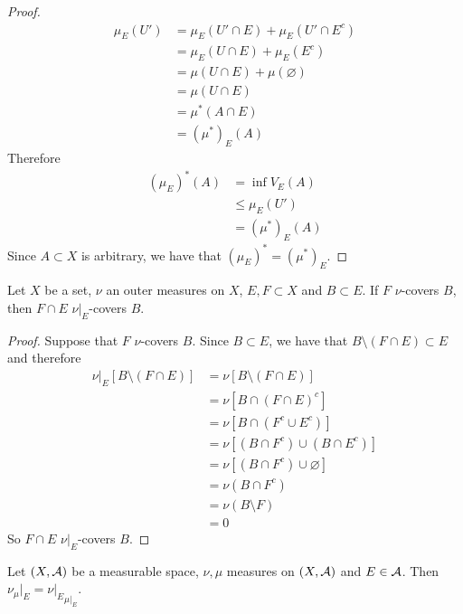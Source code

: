 \documentclass{book}
\begin{document}
\begin{proof}
\begin{align*}
			\mu_E(U')
			& = \mu_E(U' \cap E) + \mu_E(U' \cap E^c) \\
			& = \mu_E(U \cap E) + \mu_E(E^c) \\
			& = \mu(U \cap E) + \mu(\varnothing) \\
			& = \mu(U \cap E) \\
			& = \mu^*(A \cap E) \\
			& = (\mu^*)_E(A)
		\end{align*}
		Therefore 
		\begin{align*}
			(\mu_E)^*(A)
			& = \inf V_E(A) \\
			& \leq \mu_E(U') \\
			& = (\mu^*)_E(A)
		\end{align*}
		Since $A \subset X$ is arbitrary, we have that $(\mu_E)^* = (\mu^*)_E$. 
	\end{proof}
	

	\begin{ex}  
		Let $X$ be a set, $\nu$ an outer measures on $X$, $E, F \subset X$ and $B \subset E$. If $F$ $\nu$-covers $B$, then $F \cap E$ $\nu|_E$-covers $B$.
	\end{ex}

	\begin{proof}
		Suppose that $F$ $\nu$-covers $B$. Since $B \subset E$, we have that $B \setminus (F \cap E) \subset E$ and therefore
		\begin{align*}
			\nu|_E[B \setminus (F \cap E)]
			& = \nu[B \setminus (F \cap E)] \\
			& = \nu[B \cap (F \cap E)^c] \\
			& = \nu[B \cap (F^c \cup E^c)] \\
			& = \nu[(B \cap F^c) \cup (B \cap E^c)] \\
			& = \nu[(B \cap F^c) \cup \varnothing] \\
			& = \nu(B \cap F^c) \\
			& = \nu(B \setminus F) \\
			& = 0
		\end{align*} 
		So $F \cap E$ $\nu|_E$-covers $B$.
	\end{proof}
	
	\begin{ex}  
		Let $(X, \mathcal{A})$ be a measurable space, $\nu, \mu$ measures on $(X, \mathcal{A})$ and $E \in \mathcal{A}$. Then $\nu_{\mu}|_E = {\nu|_E}_{\mu|_E}$.  
	\end{ex}
	
\end{document}
